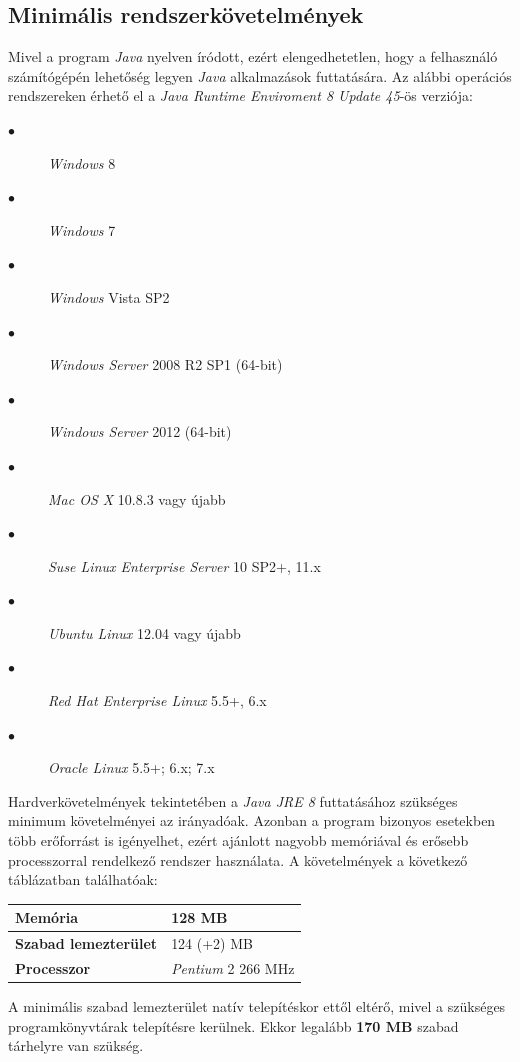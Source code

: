 \documentclass{elteikthesis}
\begin{document}
\subsection{Minimális rendszerkövetelmények}
Mivel a program \emph{Java} nyelven íródott, ezért elengedhetetlen, hogy a felhasználó számítógépén lehetőség legyen \emph{Java} alkalmazások futtatására. Az alábbi operációs rendszereken érhető el a \emph{Java Runtime Enviroment 8 Update 45}-ös verziója:\par
\begin{description}
	\item[$\bullet$] \emph{Windows} 8
	\item[$\bullet$] \emph{Windows} 7
	\item[$\bullet$] \emph{Windows} Vista SP2
	\item[$\bullet$] \emph{Windows Server} 2008 R2 SP1 (64-bit)
	\item[$\bullet$] \emph{Windows Server} 2012 (64-bit)
	\item[$\bullet$] \emph{Mac OS X} 10.8.3 vagy újabb
	\item[$\bullet$] \emph{Suse Linux Enterprise Server} 10 SP2+, 11.x
	\item[$\bullet$] \emph{Ubuntu Linux} 12.04 vagy újabb
	\item[$\bullet$] \emph{Red Hat Enterprise Linux} 5.5+, 6.x
	\item[$\bullet$] \emph{Oracle Linux} 5.5+; 6.x; 7.x
\end{description}
\par Hardverkövetelmények tekintetében a \emph{Java JRE 8} futtatásához szükséges
minimum követelményei az irányadóak. Azonban a program bizonyos esetekben több erőforrást is igényelhet, ezért ajánlott nagyobb memóriával és erősebb processzorral rendelkező rendszer használata. A követelmények a következő táblázatban találhatóak:\par
\begin{table}[H]
		\def\arraystretch{2}
		\centering
	\begin{tabular}{|l|l|}
		\hline
		\textbf{Memória}           & 128 MB            \\ \hline
		\textbf{Szabad lemezterület} & 124 (+2) MB       \\ \hline
		\textbf{Processzor}          & \emph{Pentium} 2 266 MHz \\ \hline
	\end{tabular}
\end{table}
A minimális szabad lemezterület natív telepítéskor ettől eltérő, mivel a szükséges programkönyvtárak telepítésre kerülnek. Ekkor legalább \textbf{170 MB} szabad tárhelyre van szükség.
\end{document}
